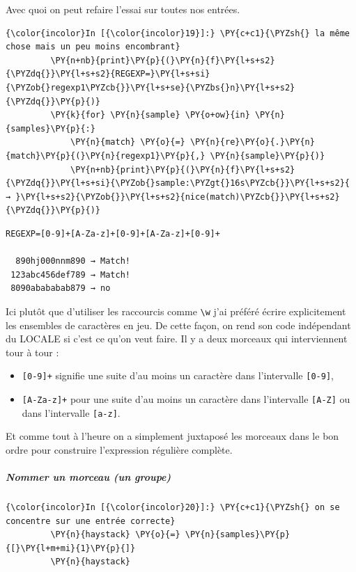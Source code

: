     Avec quoi on peut refaire l'essai sur toutes nos entrées.

    \begin{Verbatim}[commandchars=\\\{\}]
{\color{incolor}In [{\color{incolor}19}]:} \PY{c+c1}{\PYZsh{} la même chose mais un peu moins encombrant}
         \PY{n+nb}{print}\PY{p}{(}\PY{n}{f}\PY{l+s+s2}{\PYZdq{}}\PY{l+s+s2}{REGEXP=}\PY{l+s+si}{\PYZob{}regexp1\PYZcb{}}\PY{l+s+se}{\PYZbs{}n}\PY{l+s+s2}{\PYZdq{}}\PY{p}{)}
         \PY{k}{for} \PY{n}{sample} \PY{o+ow}{in} \PY{n}{samples}\PY{p}{:}
             \PY{n}{match} \PY{o}{=} \PY{n}{re}\PY{o}{.}\PY{n}{match}\PY{p}{(}\PY{n}{regexp1}\PY{p}{,} \PY{n}{sample}\PY{p}{)}
             \PY{n+nb}{print}\PY{p}{(}\PY{n}{f}\PY{l+s+s2}{\PYZdq{}}\PY{l+s+si}{\PYZob{}sample:\PYZgt{}16s\PYZcb{}}\PY{l+s+s2}{ → }\PY{l+s+s2}{\PYZob{}}\PY{l+s+s2}{nice(match)\PYZcb{}}\PY{l+s+s2}{\PYZdq{}}\PY{p}{)}
\end{Verbatim}


    \begin{Verbatim}[commandchars=\\\{\}]
REGEXP=[0-9]+[A-Za-z]+[0-9]+[A-Za-z]+[0-9]+

  890hj000nnm890 → Match!
 123abc456def789 → Match!
 8090abababab879 → no

    \end{Verbatim}

    Ici plutôt que d'utiliser les raccourcis comme
\texttt{\textbackslash{}w} j'ai préféré écrire explicitement les
ensembles de caractères en jeu. De cette façon, on rend son code
indépendant du LOCALE si c'est ce qu'on veut faire. Il y a deux morceaux
qui interviennent tour à tour :

\begin{itemize}
	\item 
	\texttt{{[}0-9{]}+} signifie une suite
	d'au moins un caractère dans l'intervalle \texttt{{[}0-9{]}},
	\item
	\texttt{{[}A-Za-z{]}+} pour une suite d'au moins un caractère dans
	l'intervalle \texttt{{[}A-Z{]}} ou dans l'intervalle \texttt{{[}a-z{]}}.
\end{itemize}

Et comme tout à l'heure on a simplement juxtaposé les morceaux dans le
bon ordre pour construire l'expression régulière complète.

    \hypertarget{nommer-un-morceau-un-groupe}{%
\subparagraph{Nommer un morceau (un
groupe)}\label{nommer-un-morceau-un-groupe}}

    \begin{Verbatim}[commandchars=\\\{\}]
{\color{incolor}In [{\color{incolor}20}]:} \PY{c+c1}{\PYZsh{} on se concentre sur une entrée correcte}
         \PY{n}{haystack} \PY{o}{=} \PY{n}{samples}\PY{p}{[}\PY{l+m+mi}{1}\PY{p}{]}
         \PY{n}{haystack}
\end{Verbatim}


